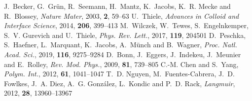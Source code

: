 \documentclass[twoside,twocolumn,9pt]{article}
\begin{document}
\begin{mcitethebibliography}{38}
J.~Becker, G.~Gr{\"u}n, R.~Seemann, H.~Mantz, K.~Jacobs, K.~R. Mecke and R.~Blossey, \emph{Nature Mater}, 2003, \textbf{2}, 59--63\relax
\mciteBstWouldAddEndPuncttrue
\mciteSetBstMidEndSepPunct{\mcitedefaultmidpunct}
{\mcitedefaultendpunct}{\mcitedefaultseppunct}\relax
\EndOfBibitem
{}
U.~Thiele, \emph{Advances in Colloid and Interface Science}, 2014, \textbf{206}, 399--413\relax
\mciteBstWouldAddEndPuncttrue
\mciteSetBstMidEndSepPunct{\mcitedefaultmidpunct}
{\mcitedefaultendpunct}{\mcitedefaultseppunct}\relax
\EndOfBibitem
{}
M.~Wilczek, W.~Tewes, S.~Engelnkemper, S.~V. Gurevich and U.~Thiele, \emph{Phys. Rev. Lett.}, 2017, \textbf{119}, 204501\relax
\mciteBstWouldAddEndPuncttrue
\mciteSetBstMidEndSepPunct{\mcitedefaultmidpunct}
{\mcitedefaultendpunct}{\mcitedefaultseppunct}\relax
\EndOfBibitem
{}
D.~Peschka, S.~Haefner, L.~Marquant, K.~Jacobs, A.~M{\"u}nch and B.~Wagner, \emph{Proc. Natl. Acad. Sci.}, 2019, \textbf{116}, 9275--9284\relax
\mciteBstWouldAddEndPuncttrue
\mciteSetBstMidEndSepPunct{\mcitedefaultmidpunct}
{\mcitedefaultendpunct}{\mcitedefaultseppunct}\relax
\EndOfBibitem
{}
D.~Bonn, J.~Eggers, J.~Indekeu, J.~Meunier and E.~Rolley, \emph{Rev. Mod. Phys.}, 2009, \textbf{81}, 739--805\relax
\mciteBstWouldAddEndPuncttrue
\mciteSetBstMidEndSepPunct{\mcitedefaultmidpunct}
{\mcitedefaultendpunct}{\mcitedefaultseppunct}\relax
\EndOfBibitem
{}
C.-M. Chen and S.~Yang, \emph{Polym. Int.}, 2012, \textbf{61}, 1041--1047\relax
\mciteBstWouldAddEndPuncttrue
\mciteSetBstMidEndSepPunct{\mcitedefaultmidpunct}
{\mcitedefaultendpunct}{\mcitedefaultseppunct}\relax
\EndOfBibitem
{}
T.~D. Nguyen, M.~{Fuentes-Cabrera}, J.~D. Fowlkes, J.~A. Diez, A.~G. Gonz{\'a}lez, L.~Kondic and P.~D. Rack, \emph{Langmuir}, 2012, \textbf{28}, 13960--13967\relax
\mciteBstWouldAddEndPuncttrue
\mciteSetBstMidEndSepPunct{\mcitedefaultmidpunct}
{\mcitedefaultendpunct}{\mcitedefaultseppunct}\relax
\EndOfBibitem
{}

\end{mcitethebibliography}
\end{document}
